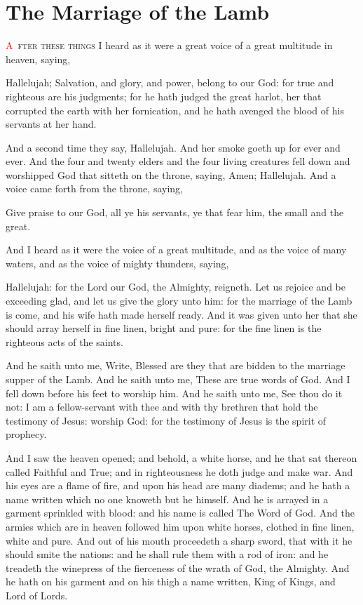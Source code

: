 
\chapter{The Marriage of the Lamb}
\lettrine[lines=3,slope=0.5em]{\textcolor{red}{A}}{\ fter these things} I heard as it were a great voice of a great multitude in heaven, saying,

\zz Hallelujah; Salvation, and glory, and power, belong to our God: 
 for true and righteous are his judgments; for he hath judged the great harlot, her that corrupted the earth with her fornication, and he hath avenged the blood of his servants at her hand.

 And a second time they say, Hallelujah. And her smoke goeth up for ever and ever. 
 And the four and twenty elders and the four living creatures fell down and worshipped God that sitteth on the throne, saying, Amen; Hallelujah. 
 And a voice came forth from the throne, saying,

Give praise to our God, all ye his servants, ye that fear him, the small and the great.

 And I heard as it were the voice of a great multitude, and as the voice of many waters, and as the voice of mighty thunders, saying,

Hallelujah: for the Lord our God, the Almighty, reigneth. 
 Let us rejoice and be exceeding glad, and let us give the glory unto him: for the marriage of the Lamb is come, and his wife hath made herself ready. 
 And it was given unto her that she should array herself in fine linen, bright and pure: for the fine linen is the righteous acts of the saints.

 And he saith unto me, Write, Blessed are they that are bidden to the marriage supper of the Lamb. And he saith unto me, These are true words of God. 
 And I fell down before his feet to worship him. And he saith unto me, See thou do it not: I am a fellow-servant with thee and with thy brethren that hold the testimony of Jesus: worship God: for the testimony of Jesus is the spirit of prophecy.

 And I saw the heaven opened; and behold, a white horse, and he that sat thereon called Faithful and True; and in righteousness he doth judge and make war. 
 And his eyes are a flame of fire, and upon his head are many diadems; and he hath a name written which no one knoweth but he himself. 
 And he is arrayed in a garment sprinkled with blood: and his name is called The Word of God. 
 And the armies which are in heaven followed him upon white horses, clothed in fine linen, white and pure. 
 And out of his mouth proceedeth a sharp sword, that with it he should smite the nations: and he shall rule them with a rod of iron: and he treadeth the winepress of the fierceness of the wrath of God, the Almighty. 
 And he hath on his garment and on his thigh a name written, King of Kings, and Lord of Lords.

